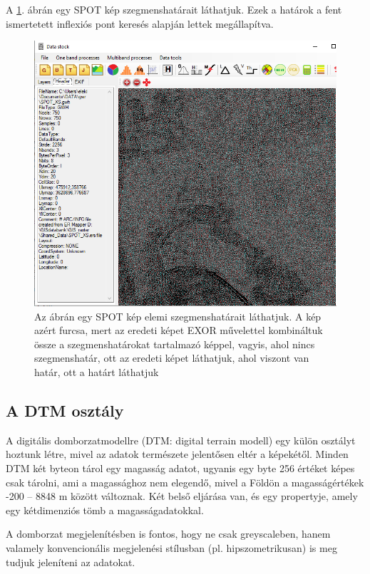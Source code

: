 \documentclass[a4paper,12pt]{article}
\begin{document}
A \ref{fig:seg2}. ábrán egy SPOT kép szegmenshatárait láthatjuk. Ezek a határok a fent ismertetett inflexiós pont keresés alapján lettek megállapítva.

\begin{figure}
	\centering
	\includegraphics[width=14cm]{seg2.png}
	\caption{Az ábrán egy SPOT kép elemi szegmenshatárait láthatjuk. A kép azért furcsa, mert az eredeti képet EXOR művelettel kombináltuk össze a szegmenshatárokat tartalmazó képpel, vagyis, ahol nincs szegmenshatár, ott az eredeti képet láthatjuk, ahol viszont van határ, ott a határt láthatjuk }
	\label{fig:seg2}
\end{figure}



\subsection{A \textbf{DTM} osztály}

A digitális domborzatmodellre (DTM: digital terrain modell) egy külön osztályt hoztunk létre, mivel az adatok természete jelentősen eltér a képekétől. Minden DTM két byteon tárol egy magasság adatot, ugyanis egy byte 256 értéket képes csak tárolni, ami a magassághoz nem elegendő, mivel a Földön a magasságértékek -200 -- 8848 m között változnak. Két belső eljárása van, és egy propertyje, amely egy kétdimenziós tömb a magasságadatokkal.

A domborzat megjelenítésben is fontos, hogy ne csak greyscaleben, hanem valamely konvencionális megjelenési stílusban (pl. hipszometrikusan) is meg tudjuk jeleníteni az adatokat. 
\end{document}
